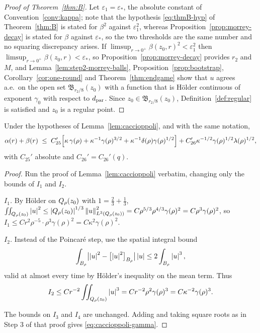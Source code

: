 \documentclass[11pt,reqno]{amsart}
\begin{document}
\begin{proof}[Proof of Theorem~\ref{thm:B}]
Let $\varepsilon_{1}=\varepsilon_{*}$, the absolute constant of
Convention~\ref{conv:kappa}; note that the hypothesis \eqref{eq:thmB-hyp} of
Theorem~\ref{thm:B} is stated for $\beta^{2}$ against $\varepsilon_{1}^{2}$,
whereas Proposition~\ref{prop:morrey-decay} is stated for $\beta$ against
$\varepsilon_{*}$, so the two thresholds are the same number and no squaring
discrepancy arises. If
$\limsup_{r\to0^{+}}\beta(z_{0},r)^{2}<\varepsilon_{1}^{2}$ then
$\limsup_{r\to0^{+}}\beta(z_{0},r)<\varepsilon_{*}$, so
Proposition~\ref{prop:morrey-decay} provides $r_{2}$ and $M$, and
Lemma~\ref{lem:step2-morrey-balls}, Proposition~\ref{prop:bootstrap},
Corollary~\ref{cor:one-round} and Theorem~\ref{thm:endgame} show that $u$
agrees a.e.\ on the open set $\mathfrak{B}_{r_{2}/8}(z_{0})$ with a function
that is H\"older continuous of exponent $\gamma_{0}$ with respect to $d_{\mathrm{par}}$.
Since $z_{0}\in\mathfrak{B}_{r_{2}/8}(z_{0})$, Definition~\ref{def:regular} is
satisfied and $z_{0}$ is a regular point.
\end{proof}

\begin{lemma}\label{lem:caccioppoli-gamma}
Under the hypotheses of Lemma~\ref{lem:caccioppoli}, and with the same notation,
\begin{equation}\label{eq:caccioppoli-gamma}
  \alpha(r)+\beta(r)\;\le\;
    C_{25}'\Bigl[\kappa\,\gamma(\rho)+\kappa^{-1}\gamma(\rho)^{3/2}
      +\kappa^{-1}\delta(\rho)\gamma(\rho)^{1/2}\Bigr]
   +C_{26}'\kappa^{-1/2}\gamma(\rho)^{1/2}\lambda(\rho)^{1/2},
\end{equation}
with $C_{25}'$ absolute and $C_{26}'=C_{26}'(q)$.
\end{lemma}

\begin{proof}
Run the proof of Lemma~\ref{lem:caccioppoli} verbatim, changing only the bounds
of $I_{1}$ and $I_{2}$.

\emph{$I_{1}$.} By H\"older on $Q_{\rho}(z_{0})$ with $1=\tfrac23+\tfrac13$,
$\iint_{Q_{\rho}(z_{0})}\left\lvert u \right\rvert^{2}
 \le\left\lvert Q_{\rho}(z_{0}) \right\rvert^{1/3}\left\lVert u \right\rVert^{2}_{L^{3}(Q_{\rho}(z_{0}))}
 =C\rho^{5/3}\rho^{4/3}\gamma(\rho)^{2}=C\rho^{3}\gamma(\rho)^{2}$, so
$I_{1}\le C r^{2}\rho^{-5}\cdot\rho^{3}\gamma(\rho)^{2}=C\kappa^{2}\gamma(\rho)^{2}$.

\emph{$I_{2}$.} Instead of the Poincar\'e step, use the spatial integral bound
\[\int_{B_{\rho}}\bigl|\left\lvert u \right\rvert^{2}-\bigl[\left\lvert u \right\rvert^{2}\bigr]_{B_{\rho}}\bigr|\left\lvert u \right\rvert\le2\int_{B_{\rho}}\left\lvert u \right\rvert^{3},\]
valid at almost every time by H\"older's inequality on the mean term. Thus
\[
I_{2}\le Cr^{-2}\iint_{Q_{\rho}(z_{0})}\left\lvert u \right\rvert^{3}
 =Cr^{-2}\rho^{2}\gamma(\rho)^{3}=C\kappa^{-2}\gamma(\rho)^{3}
.
\]

The bounds on $I_{3}$ and $I_{4}$ are unchanged. Adding and taking square roots
as in Step 3 of that proof gives \eqref{eq:caccioppoli-gamma}.
\end{proof}
\end{document}
